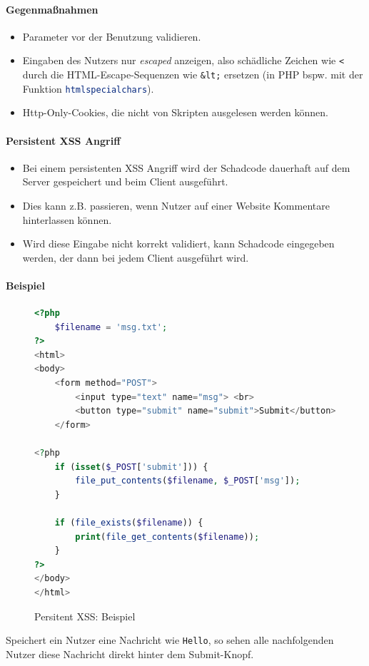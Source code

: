 \documentclass[a4paper, 11pt, accentcolor = tud3b]{tudreport}
\begin{document}
						\paragraph{Gegenmaßnahmen}
							\begin{itemize}
								\item Parameter vor der Benutzung validieren.
								\item Eingaben des Nutzers nur \textit{escaped} anzeigen, also schädliche Zeichen wie \texttt{<} durch die HTML-Escape-Sequenzen wie \texttt{\&lt;} ersetzen (in PHP bspw. mit der Funktion \lstinline[language = PHP]|htmlspecialchars|).
								\item Http-Only-Cookies, die nicht von Skripten ausgelesen werden können.
							\end{itemize}
					
					\paragraph{Persistent XSS Angriff}
						\begin{itemize}
							\item Bei einem persistenten XSS Angriff wird der Schadcode dauerhaft auf dem Server gespeichert und beim Client ausgeführt.
							\item Dies kann z.B. passieren, wenn Nutzer auf einer Website Kommentare hinterlassen können.
							\item Wird diese Eingabe nicht korrekt validiert, kann Schadcode eingegeben werden, der dann bei jedem Client ausgeführt wird.
						\end{itemize}
					
						\paragraph{Beispiel}
							\begin{figure}[H]
								\centering
								\begin{lstlisting}[language = PHP]
<?php
	$filename = 'msg.txt';
?>
<html>
<body>
	<form method="POST">
		<input type="text" name="msg"> <br>
		<button type="submit" name="submit">Submit</button>
	</form>

<?php
	if (isset($_POST['submit'])) {
		file_put_contents($filename, $_POST['msg']);
	}

	if (file_exists($filename)) {
		print(file_get_contents($filename));
	}
?>
</body>
</html>
\end{lstlisting}
								\caption{Persitent XSS: Beispiel}
							\end{figure}
							Speichert ein Nutzer eine Nachricht wie \texttt{Hello}, so sehen alle nachfolgenden Nutzer diese Nachricht direkt hinter dem Submit-Knopf.
							
\end{document}
